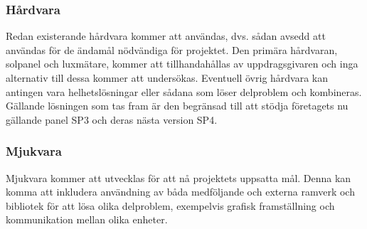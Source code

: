         \subsubsection{Hårdvara} %
        \label{ssub:h_rdvara}
            Redan existerande hårdvara kommer att användas, dvs. sådan avsedd att användas för de ändamål nödvändiga för projektet. 
            Den primära hårdvaran, solpanel och luxmätare, kommer att tillhandahållas av uppdragsgivaren och inga alternativ till dessa kommer att undersökas. 
            Eventuell övrig hårdvara kan antingen vara helhetslösningar eller sådana som löser delproblem och kombineras. 
            Gällande lösningen som tas fram är den begränsad till att stödja företagets nu gällande panel SP3 och deras nästa version SP4.\bigskip

        \subsubsection{Mjukvara} %
        \label{ssub:mjukvara}
            Mjukvara kommer att utvecklas för att nå projektets uppsatta mål. 
            Denna kan komma att inkludera användning av båda medföljande och externa ramverk och bibliotek för att lösa olika delproblem, exempelvis grafisk framställning och kommunikation mellan olika enheter.


